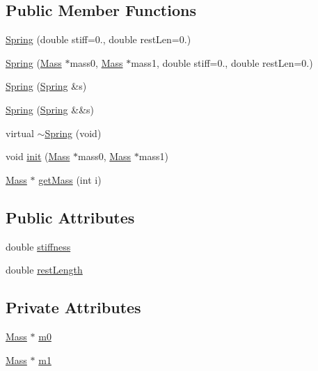 \subsection*{Public Member Functions}
\begin{DoxyCompactItemize}
\item 
\hyperlink{classSpring_ae69e4d641c622ff4bc839583ba53bfdb}{Spring} (double stiff=0., double rest\+Len=0.)
\item 
\hyperlink{classSpring_ac7d4d41e27e14f7cf5cd293cc38df645}{Spring} (\hyperlink{classMass}{Mass} $\ast$mass0, \hyperlink{classMass}{Mass} $\ast$mass1, double stiff=0., double rest\+Len=0.)
\item 
\hyperlink{classSpring_a613221adae8bbcb7d64850e58d8646c6}{Spring} (\hyperlink{classSpring}{Spring} \&s)
\item 
\hyperlink{classSpring_aba1c60d6b08ffd72dc8560d657d8b703}{Spring} (\hyperlink{classSpring}{Spring} \&\&s)
\item 
virtual \hyperlink{classSpring_a8a9311f8a7cce2868498ad3da5d9c4b8}{$\sim$\+Spring} (void)
\item 
void \hyperlink{classSpring_a274a8d1cdb7de865bbf90ad6d95d789f}{init} (\hyperlink{classMass}{Mass} $\ast$mass0, \hyperlink{classMass}{Mass} $\ast$mass1)
\item 
\hyperlink{classMass}{Mass} $\ast$ \hyperlink{classSpring_a737bbcb5fe53e65b2afbb9c62dc3186f}{get\+Mass} (int i)
\end{DoxyCompactItemize}
\subsection*{Public Attributes}
\begin{DoxyCompactItemize}
\item 
double \hyperlink{classSpring_aed22a149191c40dcef27af3e029e60fd}{stiffness}
\item 
double \hyperlink{classSpring_ab2e2b4c400fcd277234b297f4f8cfd28}{rest\+Length}
\end{DoxyCompactItemize}
\subsection*{Private Attributes}
\begin{DoxyCompactItemize}
\item 
\hyperlink{classMass}{Mass} $\ast$ \hyperlink{classSpring_a59fda4f49a5645908643319198f4206f}{m0}
\item 
\hyperlink{classMass}{Mass} $\ast$ \hyperlink{classSpring_ac7909ea9cf093d7f267982a5ec3c51c6}{m1}
\end{DoxyCompactItemize}


